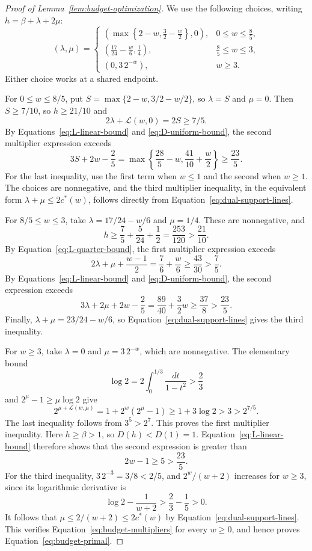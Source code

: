 \begin{proof}[Proof of Lemma~\ref{lem:budget-optimization}]
We use the following choices, writing \(h=\beta+\lambda+2\mu\):
\[
 (\lambda,\mu)=
 \begin{cases}
 \displaystyle\left(\max\left\{2-w,\frac32-\frac w2\right\},0\right),
     &\displaystyle 0\le w\le\frac85,\\[6pt]
 \displaystyle\left(\frac{17}{24}-\frac w6,\frac14\right),
     &\displaystyle \frac85\le w\le3,\\[6pt]
 (0,3\,2^{-w}),&w\ge3.
 \end{cases}
\]
Either choice works at a shared endpoint.

For \(0\le w\le8/5\), put
\(S=\max\{2-w,3/2-w/2\}\), so \(\lambda=S\) and \(\mu=0\).
Then \(S\ge7/10\), so \(h\ge21/10\) and
\[
 2\lambda+\mathcal L(w,0)=2S\ge7/5.
\]
By Equations~\eqref{eq:L-linear-bound} and
\eqref{eq:D-uniform-bound}, the second multiplier expression exceeds
\[
 3S+2w-\frac25
 =\max\left\{\frac{28}{5}-w,\frac{41}{10}+\frac w2\right\}
 \ge\frac{23}{5}.
\]
For the last inequality, use the first term when \(w\le1\) and the
second when \(w\ge1\). The choices are nonnegative, and the third
multiplier inequality, in the equivalent form
\(\lambda+\mu\le2c^*(w)\), follows directly from
Equation~\eqref{eq:dual-support-lines}.

For \(8/5\le w\le3\), take
\(\lambda=17/24-w/6\) and \(\mu=1/4\). These are nonnegative, and
\[
 h\ge\frac75+\frac5{24}+\frac12
 =\frac{253}{120}>\frac{21}{10}.
\]
By Equation~\eqref{eq:L-quarter-bound}, the first multiplier
expression exceeds
\[
 2\lambda+\mu+\frac{w-1}{2}
 =\frac76+\frac w6
 \ge\frac{43}{30}>\frac75.
\]
By Equations~\eqref{eq:L-linear-bound} and
\eqref{eq:D-uniform-bound}, the second expression exceeds
\[
 3\lambda+2\mu+2w-\frac25
 =\frac{89}{40}+\frac32w
 \ge\frac{37}{8}>\frac{23}{5}.
\]
Finally, \(\lambda+\mu=23/24-w/6\), so
Equation~\eqref{eq:dual-support-lines} gives the third inequality.

For \(w\ge3\), take \(\lambda=0\) and \(\mu=3\,2^{-w}\), which
are nonnegative. The elementary bound
\[
 \log2=2\int_0^{1/3}\frac{dt}{1-t^2}>\frac23
\]
and \(2^\mu-1\ge\mu\log2\) give
\[
 2^{\mu+\mathcal L(w,\mu)}
 =1+2^w(2^\mu-1)
 \ge1+3\log2>3>2^{7/5}.
\]
The last inequality follows from \(3^5>2^7\). This proves the first
multiplier inequality. Here \(h\ge\beta>1\), so
\(D(h)<D(1)=1\). Equation~\eqref{eq:L-linear-bound} therefore
shows that the second expression is greater than
\[
 2w-1\ge5>\frac{23}{5}.
\]
For the third inequality, \(3\,2^{-3}=3/8<2/5\), and
\(2^w/(w+2)\) increases for \(w\ge3\), since its logarithmic
derivative is
\[
 \log2-\frac1{w+2}>\frac23-\frac15>0.
\]
It follows that \(\mu\le2/(w+2)\le2c^*(w)\) by
Equation~\eqref{eq:dual-support-lines}. This verifies
Equation~\eqref{eq:budget-multipliers} for every \(w\ge0\), and
hence proves Equation~\eqref{eq:budget-primal}.
\end{proof}
